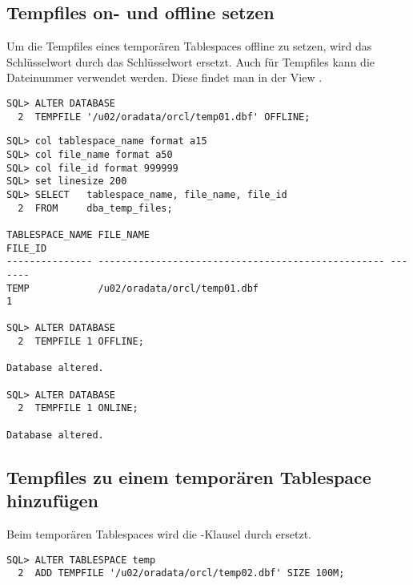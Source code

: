       \subsection{Tempfiles on- und offline setzen}
        Um die Tempfiles eines tempor\"aren Tablespaces offline zu setzen, wird das Schl\"usselwort  durch das Schl\"usselwort  ersetzt. Auch f\"ur Tempfiles kann die Dateinummer verwendet werden. Diese findet man in der View .

        \begin{lstlisting}[caption={Ein Tempfile mit Hilfe des Dateinamens offline setzen},label=admin132,language=oracle_sql]
SQL> ALTER DATABASE
  2  TEMPFILE '/u02/oradata/orcl/temp01.dbf' OFFLINE;
        \end{lstlisting}
        \begin{lstlisting}[caption={Offline-/Onlinesetzen eines Tempfiles mittels der Dateinummer},label=admin133,language=oracle_sql,alsolanguage=sqlplus]
SQL> col tablespace_name format a15
SQL> col file_name format a50
SQL> col file_id format 999999
SQL> set linesize 200
SQL> SELECT   tablespace_name, file_name, file_id
  2  FROM     dba_temp_files;

TABLESPACE_NAME FILE_NAME                                          FILE_ID
--------------- -------------------------------------------------- -------
TEMP            /u02/oradata/orcl/temp01.dbf                             1

SQL> ALTER DATABASE
  2  TEMPFILE 1 OFFLINE;

Database altered.

SQL> ALTER DATABASE
  2  TEMPFILE 1 ONLINE;

Database altered.
        \end{lstlisting}
      \subsection{Tempfiles zu einem tempor\"aren Tablespace hinzuf\"ugen}
        Beim tempor\"aren Tablespaces wird die -Klausel durch  ersetzt.
        \begin{lstlisting}[caption={Hinzuf\"ugen eines Tempfiles},label=admin134,language=oracle_sql]
SQL> ALTER TABLESPACE temp
  2  ADD TEMPFILE '/u02/oradata/orcl/temp02.dbf' SIZE 100M;
        \end{lstlisting}
